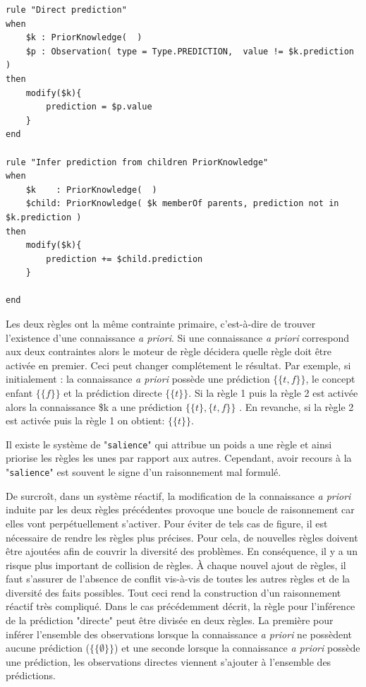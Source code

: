 \begin{refsegment}
\begin{lstlisting}[style=drl-style,caption=conflit]
rule "Direct prediction"
when
	$k : PriorKnowledge(  )
	$p : Observation( type = Type.PREDICTION,  value != $k.prediction )
then
	modify($k){
		prediction = $p.value
	}
end

rule "Infer prediction from children PriorKnowledge"
when
	$k    : PriorKnowledge(  )
	$child: PriorKnowledge( $k memberOf parents, prediction not in $k.prediction )
then
	modify($k){
		prediction += $child.prediction
	}

end
\end{lstlisting}

Les deux règles ont la même contrainte primaire, c'est-à-dire de trouver l'existence d'une connaissance \textit{a priori}. Si une connaissance \textit{a priori} correspond aux deux contraintes alors le moteur de règle décidera quelle règle doit être activée en premier. Ceci peut changer complétement le résultat. Par exemple, si  initialement : la connaissance \textit{a priori}  possède une prédiction $\{\{t,f\}\}$, le concept enfant  $\{\{f\}\}$ et la prédiction directe $\{\{t\}\}$. Si la règle 1 puis la règle  2 est activée alors la connaissance \$k a une prédiction  $\{\{t\},\{t,f\}\}$ . En revanche, si la règle 2 est activée puis la règle 1 on obtient:  $\{\{t\}\}$.

Il existe le système de "\texttt{salience}" qui attribue un poids a une règle et ainsi priorise les règles les unes par rapport aux autres.  Cependant, avoir recours à la "\texttt{salience}" est souvent le signe d'un raisonnement mal formulé. 

De surcroît, dans un système réactif, la modification de la connaissance \textit{a priori} induite par les deux règles précédentes provoque une boucle de raisonnement car elles vont perpétuellement s'activer. Pour éviter de tels cas de figure, il est nécessaire de rendre les règles plus précises. Pour cela, de nouvelles règles doivent être ajoutées afin de couvrir la diversité des problèmes. En conséquence, il y a un risque plus important de collision de règles. À chaque nouvel ajout de règles, il faut s'assurer de l'absence de conflit vis-à-vis de toutes les autres règles et de la diversité des faits possibles. Tout ceci rend la construction d'un raisonnement réactif très compliqué. Dans le cas précédemment décrit, la règle  pour l'inférence de la  prédiction "directe"  peut être divisée en deux règles. La première pour inférer l'ensemble des observations lorsque la connaissance \textit{a priori} ne possèdent aucune prédiction ($\{\{\emptyset\}\}$) et une seconde lorsque la connaissance \textit{a priori} possède une prédiction, les observations directes viennent s'ajouter à l'ensemble des prédictions.


\end{refsegment}

